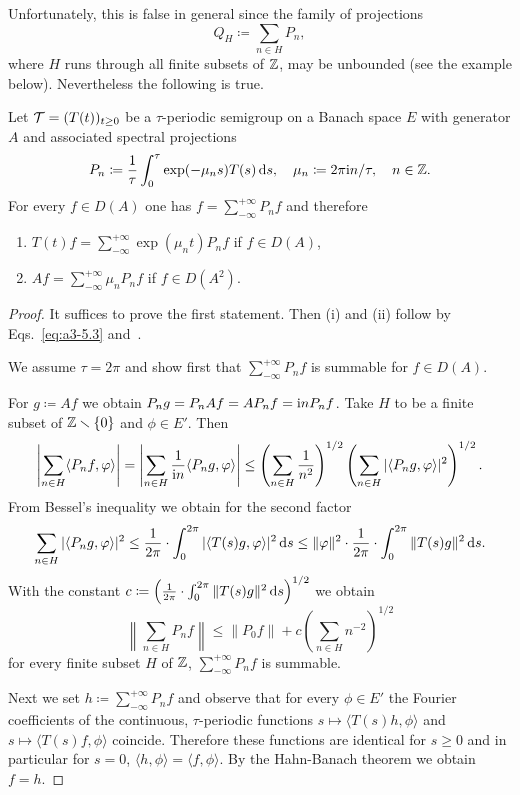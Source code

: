 Unfortunately, this is false in general since the family of projections
\[
Q_{H} \coloneq \sum_{n \in H} P_{n} ,
\]
where $H$ runs through all finite subsets of\/ $\mathbb{Z}$, may be unbounded (see the example below).
Nevertheless the following is true.
\begin{theorem}\label{thm:a3-5.4}
Let $\TT = (T(t))_{t \geq 0}$ be a $\tau$-periodic semigroup on a Banach space $E$ with generator $A$ and associated spectral projections
\[
P_{n} \coloneq  \frac{1}{\tau}\int_{0}^{\tau} \exp(-\mu_{n}s)T(s) \mathop{}\!\mathrm{d}{s}, \quad \mu_{n} \coloneq 2\pi\mathrm{i} n/\tau, \quad n \in \mathbb{Z}  .
\]
For every $f \in D(A)$ one has $f = \sum_{-\infty}^{+\infty} P_{n}f$ and therefore
\begin{enumerate}[\upshape (i)]
\item 
$T(t)f = \sum_{-\infty}^{+\infty} \exp(\mu_{n}t)P_{n}f$ \quad if\/ $f \in D(A)$,

\item 
$Af = \sum_{-\infty}^{+\infty} \mu_{n}P_{n}f$ \quad if\/ $f \in D(A^{2})$. 
\end{enumerate}
\end{theorem}
\begin{proof}
It suffices to prove the first statement. Then (i) and (ii) follow by Eqs.~\eqref{eq:a3-5.3} and~.

We assume $\tau = 2\pi$ and show first that $\sum_{-\infty}^{+\infty} P_{n}f$ is summable for $f \in D(A)$.

For $g \coloneq Af$ we obtain $P_{n}g = P_{n}Af = AP_{n}f = \mathrm{i} nP_{n}f$.
Take $H$ to be a finite subset of\/ $\mathbb{Z} \smallsetminus \{0\}$ and $\phi \in E'$. Then
\[
\left|\sum_{n \in H} \langle P_{n}f,\phi \rangle\right|
= \left|\sum_{n \in H} \frac{1}{\im n} \langle P_{n}g,\phi \rangle\right| 
\leq \left(\sum_{n \in H} \frac{1}{n^2}\right)^{1/2}\left(\sum_{n \in H} |\langle P_{n}g,\phi \rangle|^{2}\right)^{1/2} .
\]
From Bessel's inequality we obtain for the second factor
\[
\sum_{n \in H} |\langle P_{n}g,\phi \rangle|^{2} \leq \frac{1}{2\pi} \cdot \int_{0}^{2\pi} |\langle T(s)g,\phi \rangle|^{2}  \ds 
\leq \|\phi\|^{2} \cdot \frac{1}{2\pi} \cdot \int_{0}^{2\pi} \|T(s)g\|^{2}  \ds  .
\]
With the constant $c \coloneq \left(\frac{1}{2\pi} \cdot \int_{0}^{2\pi} \|T(s)g\|^{2} \mathop{}\!\mathrm{d}{s}\right)^{1/2}$ we obtain
\[
\left\|\sum_{n \in H} P_{n}f\right\| \leq \|P_{0} f\|+c\left(\sum_{n \in H} n^{-2}\right)^{1/2}
\]
for every finite subset $H$ of\/ $\mathbb{Z}$, \ie $\sum_{-\infty}^{+\infty} P_{n}f$ is summable.

Next we set $h \coloneq \sum_{-\infty}^{+\infty} P_{n}f$ and observe that for every $\phi \in E'$ the Fourier coefficients of the continuous, $\tau$-periodic functions
$s \mapsto \langle T(s)h,\phi \rangle$ and $s \mapsto \langle T(s)f,\phi \rangle$
coincide.
Therefore these functions are identical for $s \geq 0$ and in particular for $s = 0$, \ie 
$\langle h, \phi \rangle = \langle f, \phi \rangle$.
By the Hahn-Banach theorem we obtain $f = h$.
\end{proof}
